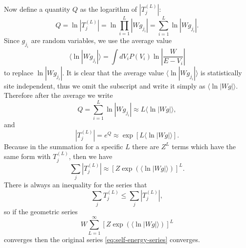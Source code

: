 \documentclass{book}
\newcommand{\average}[1]{\langle#1\rangle}
\numberwithin{equation}{section}
\begin{document}
Now define a quantity $Q$ as the logarithm of $|T^{(L)}_j|$:
\begin{equation}
  Q=\ln|T^{(L)}_j|=\ln\prod_{i=1}^L|Wg_{j_i}|=\sum_{i=1}^L\ln |Wg_{j_i}|.
\end{equation}
Since $g_{j_i}$ are random variables, we use the average value
\begin{equation}
  \average{\ln|Wg_{j_i}|}=\int dV_iP(V_i)\ln\left|\frac{W}{E-V_i}\right|
\end{equation}
to replace $\ln|Wg_{j_i}|$. It is clear that the average value
$\average{\ln|Wg_{j_i}|}$ is statistically site independent, thus we
omit the subscript and write it simply as
$\average{\ln|Wg|}$. Therefore after the average we write
\begin{equation}
  Q= \sum_{i=1}^L\ln|Wg_{j_i}|\approx L\average{\ln|Wg|},
\end{equation}
and
\begin{equation}
  |T^{(L)}_j|=e^Q\approx\exp\left[L\average{\ln|Wg|}\right].
\end{equation}
Because in the summation for a specific $L$ there are $Z^L$ terms
which have the same form with $T^{(L)}_j$, then we have
\begin{equation}
  \sum_j|T^{(L)}_j|\approx\left[Z\exp(\average{\ln|Wg|})\right]^L.
\end{equation}
There is always an inequality for the series that
\begin{equation}
  \sum_jT^{(L)}_j\le \sum_j|T^{(L)}_j|,
\end{equation}
so if the geometric series 
\begin{equation}
  W\sum_{L=1}^\infty\left[Z\exp(\average{\ln|Wg|})\right]^L
\end{equation}
converges then the original series \eqref{eq:self-energy-series}
converges.
\end{document}
